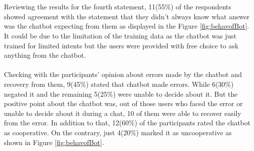 \\~\\
Reviewing the results for the fourth statement, 11(55\%) of the respondents showed agreement with the statement that they didn't always know what answer was the chatbot expecting from them as displayed in the Figure \ref{fig:behavofBot}. It could be due to the limitation of the training data as the chatbot was just trained for limited intents but the users were provided with free choice to ask anything from the chatbot. 
\\~\\
Checking with the participants' opinion about errors made by the chatbot and recovery from them, 9(45\%) stated that chatbot made errors. While 6(30\%) negated it and the remaining 5(25\%) were unable to decide about it. But the positive point about the chatbot was, out of those users who faced the error or unable to decide about it during a chat, 10 of them were able to recover easily from the error. In addition to that, 12(60\%) of the participants rated the chatbot as cooperative. On the contrary, just 4(20\%) marked it as uncooperative as shown in Figure \ref{fig:behavofBot}.


